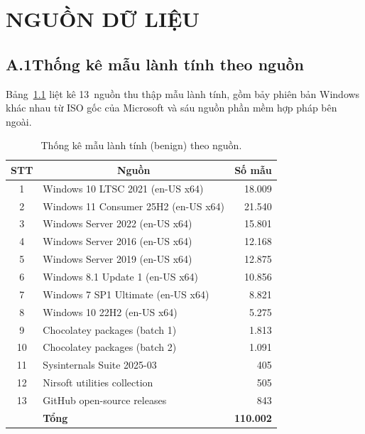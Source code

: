 \documentclass[../DoAn.tex]{subfiles}
\begin{document}
\chapter{NGUỒN DỮ LIỆU}

\section*{A.1\quad Thống kê mẫu lành tính theo nguồn}

Bảng~\ref{tab:benign-sources} liệt kê 13~nguồn thu thập mẫu lành
tính, gồm bảy phiên bản Windows khác nhau từ ISO gốc của Microsoft
và sáu nguồn phần mềm hợp pháp bên ngoài.
\begin{table}[H]
\centering
\caption{Thống kê mẫu lành tính (benign) theo nguồn.}
\label{tab:benign-sources}
\begin{tabular}{|c|l|r|}
\hline
\multicolumn{1}{|c|}{\textbf{STT}} & \multicolumn{1}{c|}{\textbf{Nguồn}} & \multicolumn{1}{c|}{\textbf{Số mẫu}} \\
\hline
1  & Windows 10 LTSC 2021 (en-US x64)      & 18.009 \\
\hline
2  & Windows 11 Consumer 25H2 (en-US x64)  & 21.540 \\
\hline
3  & Windows Server 2022 (en-US x64)       & 15.801 \\
\hline
4  & Windows Server 2016 (en-US x64)       & 12.168 \\
\hline
5  & Windows Server 2019 (en-US x64)       & 12.875 \\
\hline
6  & Windows 8.1 Update 1 (en-US x64)      & 10.856 \\
\hline
7  & Windows 7 SP1 Ultimate (en-US x64)    &  8.821 \\
\hline
8  & Windows 10 22H2 (en-US x64)           &  5.275 \\
\hline
9  & Chocolatey packages (batch 1)         &  1.813 \\
\hline
10 & Chocolatey packages (batch 2)         &  1.091 \\
\hline
11 & Sysinternals Suite 2025-03            &    405 \\
\hline
12 & Nirsoft utilities collection          &    505 \\
\hline
13 & GitHub open-source releases           &    843 \\
\hline
   & \textbf{Tổng}                         & \textbf{110.002} \\
\hline
\end{tabular}
\end{table}
\end{document}
